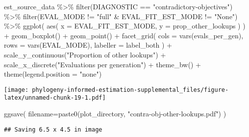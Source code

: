 \documentclass[
]{book}
\newenvironment{Shaded}{\begin{snugshade}}{\end{snugshade}}
\newcommand{\AttributeTok}[1]{\textcolor[rgb]{0.77,0.63,0.00}{#1}}
\newcommand{\FunctionTok}[1]{\textcolor[rgb]{0.00,0.00,0.00}{#1}}
\newcommand{\NormalTok}[1]{#1}
\newcommand{\SpecialCharTok}[1]{\textcolor[rgb]{0.00,0.00,0.00}{#1}}
\newcommand{\StringTok}[1]{\textcolor[rgb]{0.31,0.60,0.02}{#1}}
\begin{document}
\begin{Shaded}
\begin{Highlighting}[]
\NormalTok{est\_source\_data }\SpecialCharTok{\%\textgreater{}\%}
  \FunctionTok{filter}\NormalTok{(DIAGNOSTIC }\SpecialCharTok{==} \StringTok{"contradictory{-}objectives"}\NormalTok{) }\SpecialCharTok{\%\textgreater{}\%}
  \FunctionTok{filter}\NormalTok{(EVAL\_MODE }\SpecialCharTok{!=} \StringTok{"full"} \SpecialCharTok{\&}\NormalTok{ EVAL\_FIT\_EST\_MODE }\SpecialCharTok{!=} \StringTok{"None"}\NormalTok{) }\SpecialCharTok{\%\textgreater{}\%}
  \FunctionTok{ggplot}\NormalTok{(}
      \FunctionTok{aes}\NormalTok{(}
        \AttributeTok{x =}\NormalTok{ EVAL\_FIT\_EST\_MODE,}
        \AttributeTok{y =}\NormalTok{ prop\_other\_lookups}
\NormalTok{      )}
\NormalTok{    ) }\SpecialCharTok{+}
    \FunctionTok{geom\_boxplot}\NormalTok{() }\SpecialCharTok{+}
    \FunctionTok{geom\_point}\NormalTok{() }\SpecialCharTok{+}
    \FunctionTok{facet\_grid}\NormalTok{(}
      \AttributeTok{cols =} \FunctionTok{vars}\NormalTok{(evals\_per\_gen),}
      \AttributeTok{rows =} \FunctionTok{vars}\NormalTok{(EVAL\_MODE),}
      \AttributeTok{labeller =}\NormalTok{ label\_both}
\NormalTok{    ) }\SpecialCharTok{+}
    \FunctionTok{scale\_y\_continuous}\NormalTok{(}\StringTok{"Proportion of other lookups"}\NormalTok{) }\SpecialCharTok{+}
    \FunctionTok{scale\_x\_discrete}\NormalTok{(}\StringTok{"Evaluations per generation"}\NormalTok{) }\SpecialCharTok{+}
    \FunctionTok{theme\_bw}\NormalTok{() }\SpecialCharTok{+}
    \FunctionTok{theme}\NormalTok{(}\AttributeTok{legend.position =} \StringTok{"none"}\NormalTok{)}
\end{Highlighting}
\end{Shaded}

\texttt{[image: phylogeny-informed-estimation-supplemental\_files/figure-latex/unnamed-chunk-19-1.pdf]}

\begin{Shaded}
\begin{Highlighting}[]
\FunctionTok{ggsave}\NormalTok{(}
   \AttributeTok{filename=}\FunctionTok{paste0}\NormalTok{(plot\_directory, }\StringTok{"contra{-}obj{-}other{-}lookups.pdf"}\NormalTok{)}
\NormalTok{)}
\end{Highlighting}
\end{Shaded}

\begin{verbatim}
## Saving 6.5 x 4.5 in image
\end{verbatim}
\end{document}
